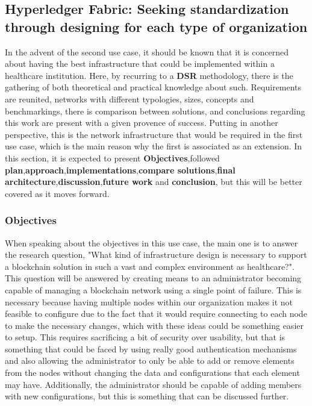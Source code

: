 \subsection{Hyperledger Fabric: Seeking standardization through designing for each type of organization}

In the advent of the second use case, it should be known that it is concerned about having the best infrastructure that could be implemented within a healthcare institution. Here, by recurring to a \textbf{DSR} methodology, there is the gathering of both theoretical and practical knowledge about such. Requirements are reunited, networks with different typologies, sizes, concepts and benchmarkings, there is comparison between solutions, and conclusions regarding this work are present with a given provence of success. Putting in another perspective, this is the network infrastructure that would be required in the first use case, which is the main reason why the first is associated as an extension. In this section, it is expected to present \textbf{Objectives},followed \textbf{plan},\textbf{approach},\textbf{implementations},\textbf{compare solutions},\textbf{final architecture},\textbf{discussion},\textbf{future work} and \textbf{conclusion}, but this will be better covered as it moves forward.

\subsubsection{Objectives}
When speaking about the objectives in this use case, the main one is to answer the research question, "What kind of infrastructure design is necessary to support a blockchain solution in such a vast and complex environment as healthcare?". This question will be answered by creating means to an administrator becoming capable of managing a blockchain network using a single point of failure. This is necessary because having multiple nodes within our organization makes it not feasible to configure due to the fact that it would require connecting to each node to make the necessary changes, which with these ideas could be something easier to setup. This requires sacrificing a bit of security over usability, but that is something that could be faced by using really good authentication mechanisms and also allowing the administrator to only be able to add or remove elements from the nodes without changing the data and configurations that each element may have. Additionally, the administrator should be capable of adding members with new configurations, but this is something that can be discussed further.

